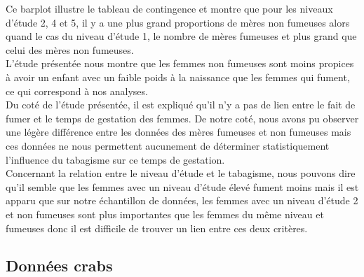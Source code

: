 \documentclass[a4paper, 9pt]{article}
\begin{document}
Ce barplot illustre le tableau de contingence et montre que pour les niveaux d'\'etude 2, 4 et 5, il y a une plus grand proportions de
m\`eres non fumeuses alors quand le cas du niveau d'\'etude 1, le nombre de m\`eres fumeuses et plus grand que celui
des m\`eres non fumeuses.\\
L'\'etude pr\'esent\'ee nous montre que les femmes non fumeuses sont moins propices \`a avoir un enfant avec un faible poids à la naissance
que les femmes qui fument, ce qui correspond à nos analyses.\\
Du cot\'e de l'\'etude pr\'esent\'ee, il est expliqu\'e qu'il n'y a pas de lien entre le fait de fumer et le temps de gestation des femmes.
De notre cot\'e, nous avons pu observer une l\'eg\`ere diff\'erence entre les donn\'ees des m\`eres fumeuses et non fumeuses mais ces donn\'ees
ne nous permettent aucunement de d\'eterminer statistiquement l'influence du tabagisme sur ce temps de gestation.\\
Concernant la relation entre le niveau d'\'etude et le tabagisme, nous pouvons dire qu'il semble que les femmes avec un niveau d'\'etude
\'elev\'e fument moins mais il est apparu que sur notre \'echantillon de donn\'ees, les femmes avec un niveau d'\'etude 2 et non fumeuses
sont plus importantes que les femmes du m\^eme niveau et fumeuses donc il est difficile de trouver un lien entre ces deux crit\`eres.
\newpage
\subsection{Données crabs}
\end{document}
